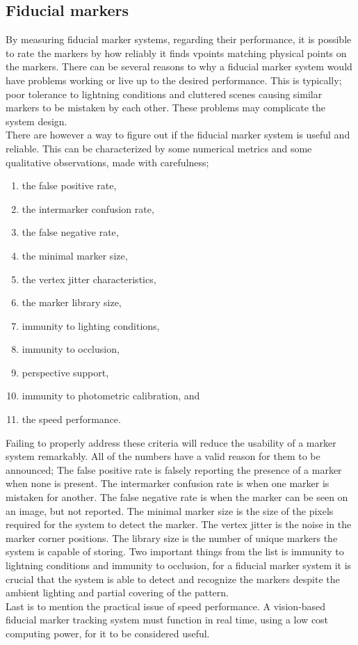 \subsection{Fiducial markers}\label{sec:fiducialMarkers}
By measuring fiducial marker systems, regarding their performance, it is possible to rate the markers by how reliably it finds vpoints matching physical points on the markers. There can be several reasons to why a fiducial marker system would have problems working or live up to the desired performance. This is typically; poor tolerance to lightning conditions and cluttered scenes causing similar markers to be mistaken by each other\cite{fiducialMarkers}. These problems may complicate the system design.\\

There are however a way to figure out if the fiducial marker system is useful and reliable. This can be characterized by some numerical metrics and some qualitative observations, made with carefulness;\\
\begin{enumerate}
	\item the false positive rate,
	\item the intermarker confusion rate,
	\item the false negative rate,
	\item the minimal marker size,
	\item the vertex jitter characteristics,
	\item the marker library size,
	\item immunity to lighting conditions,
	\item immunity to occlusion,
	\item perspective support,
	\item immunity to photometric calibration, and
	\item the speed performance.\\
\end{enumerate}

Failing to properly address these criteria will reduce the usability of a marker system remarkably\cite{fiducialMarkers}. All of the numbers have a valid reason for them to be announced; The false positive rate is falsely reporting the presence of a marker when none is present. The intermarker confusion rate is when one marker is mistaken for another. The false negative rate is when the marker can be seen on an image, but not reported. The minimal marker size is the size of the pixels required for the system to detect the marker. The vertex jitter is the noise in the marker corner positions. The library size is the number of unique markers the system is capable of storing. Two important things from the list is immunity to lightning conditions and immunity to occlusion, for a fiducial marker system it is crucial that the system is able to detect and recognize the markers despite the ambient lighting and partial covering of the pattern.\\
Last is to mention the practical issue of speed performance. A vision-based fiducial marker tracking system must function in real time, using a low cost computing power, for it to be considered useful.\\

